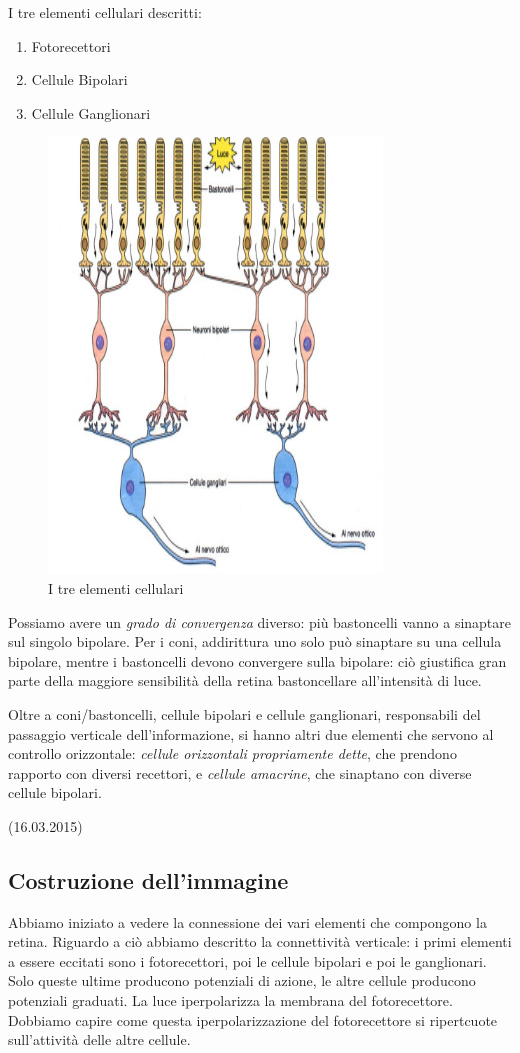 \documentclass[a4paper,12pt]{article}
\begin{document}
I tre elementi cellulari descritti: 
\begin{enumerate}
\item{Fotorecettori}
\item{Cellule Bipolari}
\item{Cellule Ganglionari}
\end{enumerate} 

\begin{figure}[H]
\centering
\includegraphics[scale=0.4]{immagine/tipi.jpg}
\caption{I tre elementi cellulari}
\end{figure}

Possiamo avere un \emph{grado di convergenza} diverso: più bastoncelli vanno a sinaptare sul singolo bipolare. Per i coni, addirittura uno solo può sinaptare su una cellula bipolare, mentre i bastoncelli devono convergere sulla bipolare: ciò giustifica gran parte della maggiore sensibilità della retina bastoncellare all'intensità di luce.

Oltre a coni/bastoncelli, cellule bipolari e cellule ganglionari, responsabili del passaggio verticale dell'informazione, si hanno altri due elementi che servono al controllo orizzontale: \emph{cellule orizzontali propriamente dette}, che prendono rapporto con diversi recettori, e \emph{cellule amacrine}, che sinaptano con diverse cellule bipolari. 

(16.03.2015)
\subsection{Costruzione dell'immagine}
Abbiamo iniziato a vedere la connessione dei vari elementi che compongono la retina. Riguardo a ciò abbiamo descritto la connettività verticale: i primi elementi a essere eccitati sono i fotorecettori, poi le cellule bipolari e poi le ganglionari. Solo queste ultime producono potenziali di azione, le altre cellule producono potenziali graduati. La luce iperpolarizza la membrana del fotorecettore. Dobbiamo capire come questa iperpolarizzazione del fotorecettore si ripertcuote sull'attività delle altre cellule.
\end{document}
